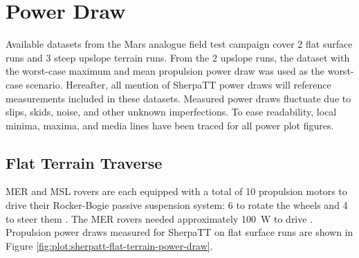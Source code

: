 \section{Power Draw}
\label{sec:PropulsionPowerConstraints:PowerDraw}
Available datasets from the Mars analogue field test campaign cover 2 flat surface runs and 3 steep upslope terrain runs. From the 2 upslope runs, the dataset with the worst-case maximum and mean propulsion power draw was used as the worst-case scenario. Hereafter, all mention of SherpaTT power draws will reference measurements included in these datasets. Measured power draws fluctuate due to slips, skids, noise, and other unknown imperfections. To ease readability, local minima, maxima, and media lines have been traced for all power plot figures.


\subsection{Flat Terrain Traverse}
\label{sec:PropulsionPowerConstraints:FlatTerrainTraverse}
MER and MSL rovers are each equipped with a total of 10 propulsion motors to drive their Rocker-Bogie passive suspension system: 6 to rotate the wheels and 4 to steer them  . The MER rovers needed approximately \SI{100}{\watt} to drive . Propulsion power draws measured for SherpaTT on flat surface runs are shown in Figure \ref{fig:plot:sherpatt-flat-terrain-power-draw}.

